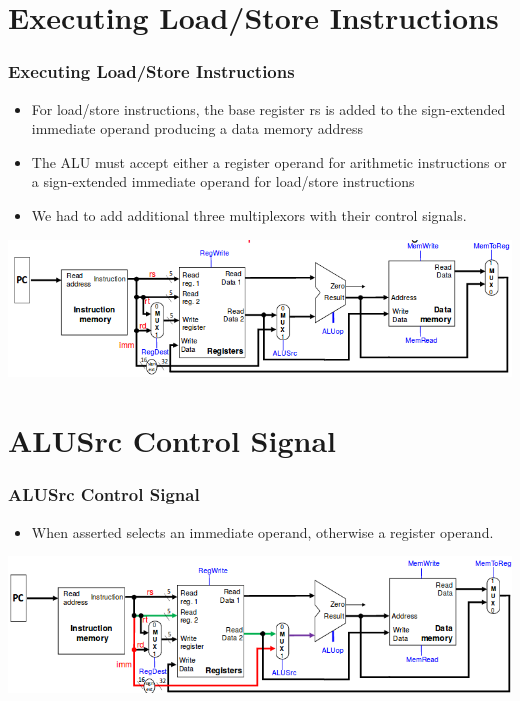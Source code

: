 \documentclass{beamer}
\begin{document}
\section{Executing Load/Store Instructions}
\begin{frame}
\frametitle{Executing Load/Store Instructions}
\begin{itemize}
\item For load/store instructions, the base register {\color{red}rs} is added to the {\color{red}sign-extended} immediate operand producing a data memory address
\item The ALU must accept either a register operand for arithmetic instructions or a sign-extended immediate operand for load/store instructions
\item We had to add additional three {\color{red}multiplexors} with their control signals.
\end{itemize}
\includegraphics[scale=0.35]{loadstore.png}
\end{frame}
\section{ALUSrc Control Signal}
\begin{frame}
\frametitle{ALUSrc Control Signal}
\begin{itemize}
\item When asserted selects an {\color{red} immediate} operand, otherwise a {\color{green}register} operand.
\end{itemize}
\includegraphics[scale=0.4]{alusrc.png}
\end{frame}
\end{document}
